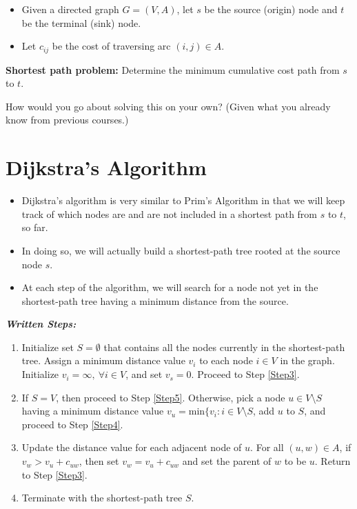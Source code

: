 \documentclass[12pt]{article}
\theoremstyle{definition}
\begin{document}
\begin{itemize}
\item Given a directed graph $G=(V,A)$, let $s$ be the source (origin) node and $t$ be the terminal (sink) node. 
\item Let $c_{ij}$ be the cost of traversing arc $(i,j) \in A$.
\end{itemize}

\textbf{Shortest path problem:} Determine the minimum cumulative cost path from $s$ to $t$.


How would you go about solving this on your own? (Given what you already know from previous courses.)

\vfill

\section{Dijkstra's Algorithm}

\begin{itemize}
	\item Dijkstra's algorithm is very similar to Prim's Algorithm in that we will keep track of which nodes are and are not included in a shortest path from $s$ to $t$, so far.  
	\item In doing so, we will actually build a shortest-path tree rooted at the source node $s$.
	\item At each step of the algorithm, we will search for a node not yet in the shortest-path tree having a minimum distance from the source.
\end{itemize}


\vfill

\newpage

\emph{\textbf{Written Steps:}}
\begin{enumerate}
	\item Initialize set $S = \emptyset$ that contains all the nodes currently in the shortest-path tree. Assign a minimum distance value $v_i$ to each node $i \in V$ in the graph. Initialize $v_i = \infty, \ \forall i \in V$, and set $v_s = 0$.  Proceed to Step \ref{Step3}. \label{Step1}
	\item If $S = V$, then proceed to Step \ref{Step5}. Otherwise, pick a node $u \in V \setminus S$ having a minimum distance value $v_u = \textrm{min} \{v_i: i \in V\setminus S$, add $u$ to $S$, and proceed to Step \ref{Step4}. \label{Step3}
	\item Update the distance value for each adjacent node of $u$. For all $(u,w) \in A$, if $v_w > v_u + c_{uw}$, then set $v_w = v_u + c_{uw}$ and set the parent of $w$ to be $u$. Return to Step \ref{Step3}. \label{Step4}
	\item Terminate with the shortest-path tree $S$. \label{Step5}
\end{enumerate}
\end{document}
